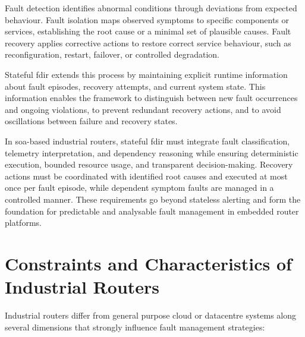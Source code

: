 Fault detection identifies abnormal conditions through deviations from expected behaviour. Fault isolation maps observed symptoms to specific components or services, establishing the root cause or a minimal set of plausible causes. Fault recovery applies corrective actions to restore correct service behaviour, such as reconfiguration, restart, failover, or controlled degradation.

Stateful \gls{fdir} extends this process by maintaining explicit runtime information about fault episodes, recovery attempts, and current system state. This information enables the framework to distinguish between new fault occurrences and ongoing violations, to prevent redundant recovery actions, and to avoid oscillations between failure and recovery states.

In \gls{soa}-based industrial routers, stateful \gls{fdir} must integrate fault classification, telemetry interpretation, and dependency reasoning while ensuring deterministic execution, bounded resource usage, and transparent decision-making. Recovery actions must be coordinated with identified root causes and executed at most once per fault episode, while dependent symptom faults are managed in a controlled manner. These requirements go beyond stateless alerting and form the foundation for predictable and analysable fault management in embedded router platforms.

\section{Constraints and Characteristics of Industrial Routers}\label{sec:router-constraints}

Industrial routers differ from general purpose cloud or datacentre systems along several dimensions that strongly influence fault management strategies:

